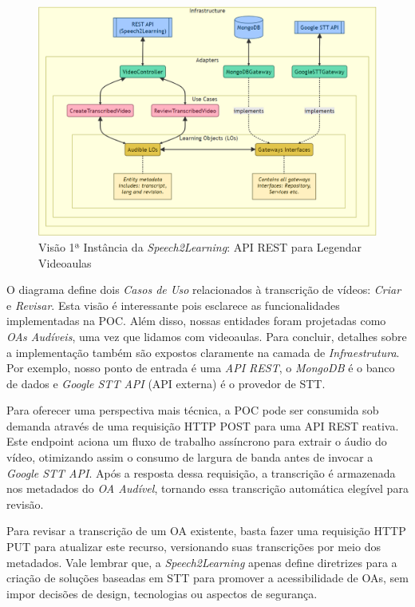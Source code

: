 \begin{figure}[htb]
\centering
\caption{Visão 1ª Instância da \textit{Speech2Learning}: API REST para Legendar Videoaulas}
\label{fig:chapter4-cs1-poc-diagram}
\includegraphics[width=\columnwidth]{images/chapter4-cs1-poc-diagram.png}
\end{figure}

O diagrama define dois \textit{Casos de Uso} relacionados à transcrição de vídeos: \textit{Criar} e \textit{Revisar}. Esta visão é interessante pois esclarece as funcionalidades implementadas na POC. Além disso, nossas entidades foram projetadas como \textit{OAs Audíveis}, uma vez que lidamos com videoaulas. Para concluir, detalhes sobre a implementação também são expostos claramente na camada de \textit{Infraestrutura}. Por exemplo, nosso ponto de entrada é uma \textit{API REST}, o \textit{MongoDB} é o banco de dados e \textit{Google STT API} (API externa) é o provedor de STT.

Para oferecer uma perspectiva mais técnica, a POC pode ser consumida sob demanda através de uma requisição HTTP POST para uma API REST reativa. Este endpoint aciona um fluxo de trabalho assíncrono para extrair o áudio do vídeo, otimizando assim o consumo de largura de banda antes de invocar a \textit{Google STT API}. Após a resposta dessa requisição, a transcrição é armazenada nos metadados do \textit{OA Audível}, tornando essa transcrição automática elegível para revisão.

Para revisar a transcrição de um OA existente, basta fazer uma requisição HTTP PUT para atualizar este recurso, versionando suas transcrições por meio dos metadados. Vale lembrar que, a \textit{Speech2Learning} apenas define diretrizes para a criação de soluções baseadas em STT para promover a acessibilidade de OAs, sem impor decisões de design, tecnologias ou aspectos de segurança.

